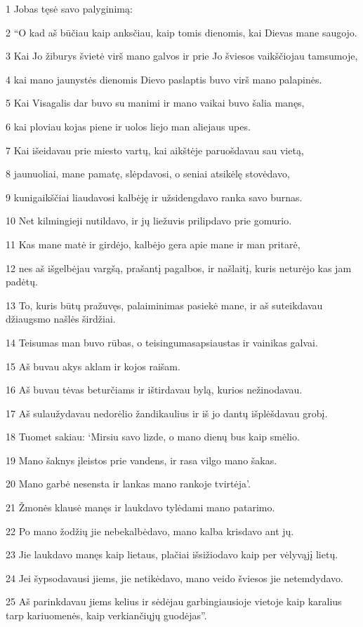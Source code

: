 \par 1 Jobas tęsė savo palyginimą: 
\par 2 “O kad aš būčiau kaip anksčiau, kaip tomis dienomis, kai Dievas mane saugojo. 
\par 3 Kai Jo žiburys švietė virš mano galvos ir prie Jo šviesos vaikščiojau tamsumoje, 
\par 4 kai mano jaunystės dienomis Dievo paslaptis buvo virš mano palapinės. 
\par 5 Kai Visagalis dar buvo su manimi ir mano vaikai buvo šalia manęs, 
\par 6 kai ploviau kojas piene ir uolos liejo man aliejaus upes. 
\par 7 Kai išeidavau prie miesto vartų, kai aikštėje paruošdavau sau vietą, 
\par 8 jaunuoliai, mane pamatę, slėpdavosi, o seniai atsikėlę stovėdavo, 
\par 9 kunigaikščiai liaudavosi kalbėję ir užsidengdavo ranka savo burnas. 
\par 10 Net kilmingieji nutildavo, ir jų liežuvis prilipdavo prie gomurio. 
\par 11 Kas mane matė ir girdėjo, kalbėjo gera apie mane ir man pritarė, 
\par 12 nes aš išgelbėjau vargšą, prašantį pagalbos, ir našlaitį, kuris neturėjo kas jam padėtų. 
\par 13 To, kuris būtų pražuvęs, palaiminimas pasiekė mane, ir aš suteikdavau džiaugsmo našlės širdžiai. 
\par 14 Teisumas man buvo rūbas, o teisingumas­apsiaustas ir vainikas galvai. 
\par 15 Aš buvau akys aklam ir kojos raišam. 
\par 16 Aš buvau tėvas beturčiams ir ištirdavau bylą, kurios nežinodavau. 
\par 17 Aš sulaužydavau nedorėlio žandikaulius ir iš jo dantų išplėšdavau grobį. 
\par 18 Tuomet sakiau: ‘Mirsiu savo lizde, o mano dienų bus kaip smėlio. 
\par 19 Mano šaknys įleistos prie vandens, ir rasa vilgo mano šakas. 
\par 20 Mano garbė nesensta ir lankas mano rankoje tvirtėja’. 
\par 21 Žmonės klausė manęs ir laukdavo tylėdami mano patarimo. 
\par 22 Po mano žodžių jie nebekalbėdavo, mano kalba krisdavo ant jų. 
\par 23 Jie laukdavo manęs kaip lietaus, plačiai išsižiodavo kaip per vėlyvąjį lietų. 
\par 24 Jei šypsodavausi jiems, jie netikėdavo, mano veido šviesos jie netemdydavo. 
\par 25 Aš parinkdavau jiems kelius ir sėdėjau garbingiausioje vietoje kaip karalius tarp kariuomenės, kaip verkiančiųjų guodėjas”.



